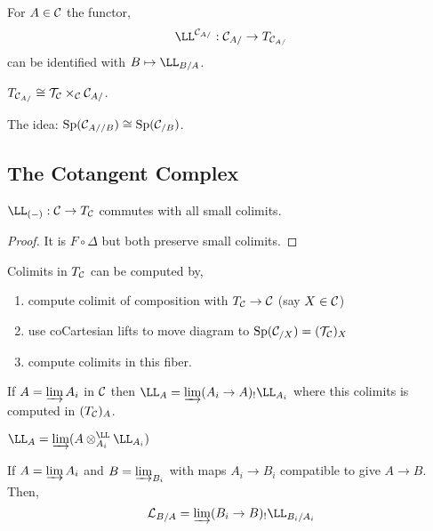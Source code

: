 \documentclass[12pt]{article}
\begin{document}
\begin{theorem}
For $A \in \mathcal{C}$ the functor,
\[ \LL^{\C_{A/}} : \C_{A/} \to T_{\C_{A/}} \]
can be identified with $B \mapsto \LL_{B/A}$. 
\end{theorem}

\begin{theorem}
$T_{\mathcal{C}_{A/}} \cong \mathcal{T}_{\mathcal{C}} \times_{\mathcal{C}} \mathcal{C}_{A/}$.
\end{theorem}

\begin{rmk}
The idea: $\mathrm{Sp}(\mathcal{C}_{A//B}) \cong \mathrm{Sp}(\mathcal{C}_{/B})$.
\end{rmk}

\subsection{The Cotangent Complex}

\begin{prop}
$\LL_{(-)} : \C \to T_{\C}$ commutes with all small colimits.
\end{prop}

\begin{proof}
It is $F \circ \Delta$ but both preserve small colimits. 
\end{proof}

\begin{rmk}
Colimits in $T_{\mathcal{C}}$ can be computed by,
\begin{enumerate}
\item compute colimit of composition with $T_{\mathcal{C}} \to \mathcal{C}$ (say $X \in \mathcal{C}$)

\item use coCartesian lifts to move diagram to $\mathrm{Sp}(\mathcal{C}_{/X}) = (\mathcal{T}_{\mathcal{C}})_X$

\item compute colimits in this fiber. 
\end{enumerate}
\end{rmk}

\begin{prop}
If $A = \varinjlim A_i$ in $\mathcal{C}$ then $\LL_{A} = \dlim (A_i \to A)_{!} \LL_{A_i}$ where this colimits is computed in $(T_{\mathcal{C}})_A$.
\end{prop}

\begin{cor}
$\LL_A = \dlim (A \ot^{\LL}_{A_i} \LL_{A_i})$
\end{cor}

\begin{prop}
If $A = \varinjlim A_i$ and $B = \varinjlim_{B_i}$ with maps $A_i \to B_i$ compatible to give $A \to B$. Then,
\[ \L_{B/A} = \dlim (B_i \to B)_! \LL_{B_i / A_i} \]
\end{prop}
\end{document}
